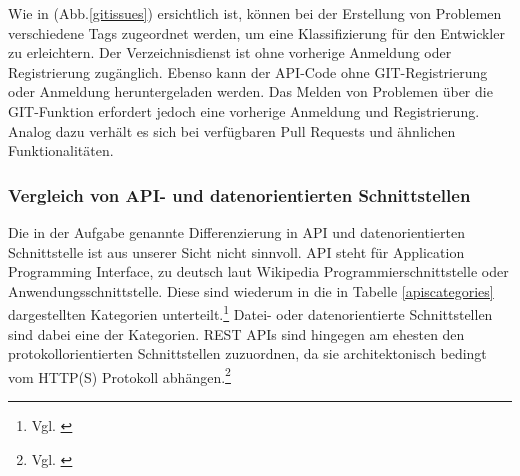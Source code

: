 \documentclass[notitlepage, hidelinks]{article}
\begin{document}
Wie in (Abb.\ref{gitissues}) ersichtlich ist, können bei der Erstellung von Problemen verschiedene Tags zugeordnet werden, um eine Klassifizierung für den Entwickler zu erleichtern.
Der Verzeichnisdienst ist ohne vorherige Anmeldung oder Registrierung zugänglich. Ebenso kann der API-Code ohne GIT-Registrierung oder Anmeldung heruntergeladen werden. Das Melden von Problemen über die GIT-Funktion erfordert jedoch eine vorherige Anmeldung und Registrierung. Analog dazu verhält es sich bei verfügbaren Pull Requests und ähnlichen Funktionalitäten.

\subsubsection{Vergleich von API- und datenorientierten Schnittstellen}
Die in der Aufgabe genannte Differenzierung in API und datenorientierten Schnittstelle ist aus unserer Sicht nicht sinnvoll. API steht für Application Programming Interface, zu deutsch laut Wikipedia Programmierschnittstelle oder Anwendungsschnittstelle. Diese sind wiederum in die in Tabelle \ref{apiscategories} dargestellten Kategorien unterteilt.\footnote{Vgl. \cite{api-wiki}} Datei- oder datenorientierte Schnittstellen sind dabei eine der Kategorien. REST APIs sind hingegen am ehesten den protokollorientierten Schnittstellen zuzuordnen, da sie architektonisch bedingt vom HTTP(S) Protokoll abhängen.\footnote{Vgl. \cite{api-systempilot}}
\end{document}
